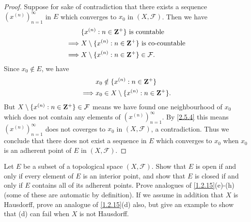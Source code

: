 \begin{proof}
  Suppose for sake of contradiction that there exists a sequence \((x^{(n)})_{n = 1}^\infty\) in \(E\) which converges to \(x_0\) in \((X, \mathcal{F})\).
  Then we have
  \begin{align*}
             & \{x^{(n)} : n \in \mathbf{Z}^+\} \text{ is countable}                \\
    \implies & X \setminus \{x^{(n)} : n \in \mathbf{Z}^+\} \text{ is co-countable} \\
    \implies & X \setminus \{x^{(n)} : n \in \mathbf{Z}^+\} \in \mathcal{F}.
  \end{align*}
  Since \(x_0 \notin E\), we have
  \begin{align*}
             & x_0 \notin \{x^{(n)} : n \in \mathbf{Z}^+\}           \\
    \implies & x_0 \in X \setminus \{x^{(n)} : n \in \mathbf{Z}^+\}.
  \end{align*}
  But \(X \setminus \{x^{(n)} : n \in \mathbf{Z}^+\} \in \mathcal{F}\) means we have found one neighbourhood of \(x_0\) which does not contain any elements of \((x^{(n)})_{n = 1}^\infty\).
  By \cref{2.5.4} this means \((x^{(n)})_{n = 1}^\infty\) does not coverges to \(x_0\) in \((X, \mathcal{F})\), a contradiction.
  Thus we conclude that there does not exist a sequence in \(E\) which converges to \(x_0\) when \(x_0\) is an adherent point of \(E\) in \((X, \mathcal{F})\).
\end{proof}

\begin{exercise}\label{ex 2.5.11}
  Let \(E\) be a subset of a topological space \((X, \mathcal{F})\).
  Show that \(E\) is open if and only if every element of \(E\) is an interior point, and show that \(E\) is closed if and only if \(E\) contains all of its adherent points.
  Prove analogues of \cref{1.2.15}(e)-(h) (some of these are automatic by definition).
  If we assume in addition that \(X\) is Hausdorff, prove an analogue of \cref{1.2.15}(d) also, but give an example to show that (d) can fail when \(X\) is not Hausdorff.
\end{exercise}

